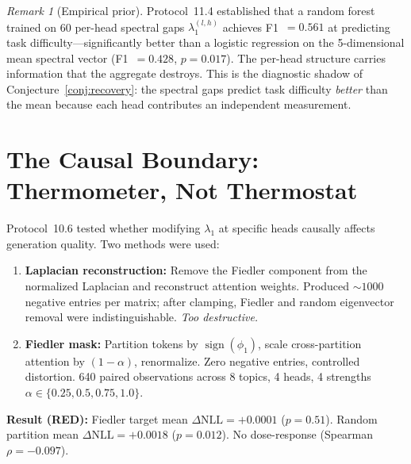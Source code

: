 \documentclass[11pt]{article}
\theoremstyle{remark}
\newtheorem{remark}[definition]{Remark}
\DeclareMathOperator{\sign}{sign}
\begin{document}
\begin{remark}[Empirical prior]\label{rem:empirical}
Protocol~11.4 established that a random forest trained on 
60 per-head spectral gaps $\lambda_1^{(l,h)}$ achieves 
F1~$= 0.561$ at predicting task difficulty---significantly 
better than a logistic regression on the 5-dimensional 
mean spectral vector (F1~$= 0.428$, $p = 0.017$). The 
per-head structure carries information that the aggregate 
destroys. This is the diagnostic shadow of 
Conjecture~\ref{conj:recovery}: the spectral gaps predict 
task difficulty \emph{better} than the mean because each 
head contributes an independent measurement.
\end{remark}


\section{The Causal Boundary: Thermometer, Not Thermostat}
\label{sec:causal}

Protocol~10.6 tested whether modifying $\lambda_1$ at 
specific heads causally affects generation quality. Two 
methods were used:

\begin{enumerate}[nosep]
  \item \textbf{Laplacian reconstruction:} Remove the Fiedler 
    component from the normalized Laplacian and reconstruct 
    attention weights. Produced ${\sim}1000$ negative entries 
    per matrix; after clamping, Fiedler and random eigenvector 
    removal were indistinguishable. \emph{Too destructive.}
  \item \textbf{Fiedler mask:} Partition tokens by $\sign(\phi_1)$, 
    scale cross-partition attention by $(1 - \alpha)$, 
    renormalize. Zero negative entries, controlled distortion. 
    640 paired observations across 8 topics, 4 heads, 4 
    strengths $\alpha \in \{0.25, 0.5, 0.75, 1.0\}$.
\end{enumerate}

\noindent\textbf{Result (RED):} Fiedler target mean 
$\Delta\text{NLL} = +0.0001$ ($p = 0.51$). Random partition 
mean $\Delta\text{NLL} = +0.0018$ ($p = 0.012$). No 
dose-response (Spearman $\rho = -0.097$). 
\end{document}

